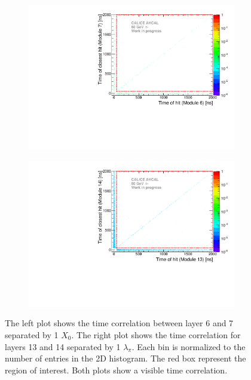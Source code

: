 \begin{figure}[htbp!]
	\begin{subfigure}[t]{0.5\textwidth}
		\centering
		\includegraphics[width=1\textwidth]{../Thesis_Plots/Timing/Pions/Plots/Time_Correlation_short.pdf}
		\caption{} \label{fig:Time_Corr_short}
	\end{subfigure}
	\hfill
	\begin{subfigure}[t]{0.5\textwidth}
		\centering
		\includegraphics[width=1\textwidth]{../Thesis_Plots/Timing/Pions/Plots/Time_Correlation_long.pdf}
		\caption{}\label{fig:Time_Corr_long}
	\end{subfigure}
	\caption{The left plot shows the time correlation between layer 6 and 7 separated by 1 $X_0$. The right plot shows the time correlation for layers 13 and 14 separated by 1 $\lambda_{\pi}$. Each bin is normalized to the number of entries in the 2D histogram. The red box represent the region of interest. Both plots show a visible time correlation.}
	\label{fig:TimeCorrelation}
\end{figure}
